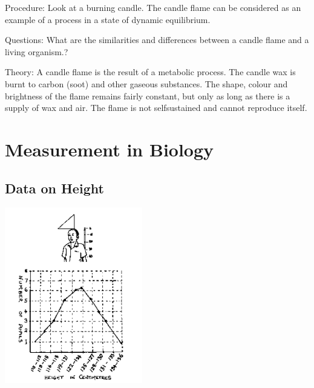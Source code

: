 \begin{multicols}{2}
\begin{description*}
\item[Procedure:]{Look at a burning candle. The candle flame can be considered as an example of a process
in a state of dynamic equilibrium.}
\item[Questions:]{What are the similarities and differences between a candle flame and a living organism.?}
\item[Theory:]{A candle flame is the result of a metabolic process. The candle wax is burnt to carbon
(soot) and other gaseous substances. The shape, colour and brightness of the flame remains
fairly constant, but only as long as there is a supply of wax and air. The flame is not selfsustained
and cannot reproduce itself.}
\end{description*}


\section*{Measurement in Biology}


\subsection{Data on Height} %

\begin{center}
\includegraphics[width=0.45\textwidth]{./img/source/data-height.png}
\end{center}


\end{multicols}
